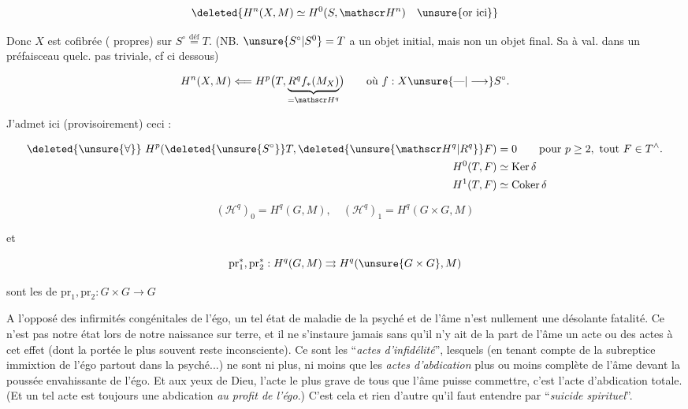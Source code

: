 \[
 \deleted{H^n(X,M)\simeq H^0(S,\mathscr H^n)\quad\unsure{\text{or ici}}}
\]

 Donc $X$ est cofibrée (  propres) sur $S^\circ\overset{\text{déf}}{=}T$. (NB. $\unsure{S^\circ|S^0}=T$ a un objet initial, mais non un objet final. Sa  à val. dans un préfaisceau quelc.  pas   triviale, cf ci dessous)

\[
 H^n(X,M)\Longleftarrow H^p\bigl(T,\underbrace{R^q f_*(M_X)}_{=\mathscr H^q}\bigr)
 \qquad \text{où }f:X\unsure{\text{---}|\longrightarrow} S^\circ .
\]

J'admet ici (provisoirement) ceci :

\[
 \begin{aligned}
 \deleted{\unsure{\forall}}\ H^p(\deleted{\unsure{S^\circ}}T,\deleted{\unsure{\mathscr H^q|R^q}}F)&=0\qquad\text{pour }p\geq2,\ \text{tout }F\in T^\wedge.\\
 H^0(T,F)&\simeq\operatorname{Ker}\delta\\
 H^1(T,F)&\simeq\operatorname{Coker}\delta
 \end{aligned}
\]



 

\[
 (\mathscr H^q)_0=H^q(G,M),\quad (\mathscr H^q)_1=H^q(G\times G,M)
\]

et

\[
 \mathrm{pr}_1^*,\mathrm{pr}_2^*:H^q(G,M)\rightrightarrows H^q(\unsure{G\times G},M)
\]

sont les  de $\mathrm{pr}_1,\mathrm{pr}_2:G\times G\longrightarrow G$


A l'opposé des infirmités congénitales de l'égo, un tel état de maladie de la psyché et de l'âme n'est nullement une désolante fatalité. Ce n'est pas notre état lors de notre naissance sur terre, et il ne s'instaure jamais sans qu'il n'y ait de la part de l'âme un acte ou des actes à cet effet (dont la portée le plus souvent reste inconsciente). Ce sont les ``\textit{actes d'infidélité}'', lesquels (en tenant compte de la subreptice immixtion de l'égo partout dans la psyché...) ne sont ni plus, ni moins que les \textit{actes d'abdication} plus ou moins complète de l'âme devant la poussée envahissante de l'égo. Et aux yeux de Dieu, l'acte le plus grave de tous que l'âme puisse commettre, c'est l'acte d'abdication totale. (Et un tel acte est toujours une abdication \textit{au profit de l'égo}.) C'est cela et rien d'autre qu'il faut entendre par ``\textit{suicide spirituel}''.

